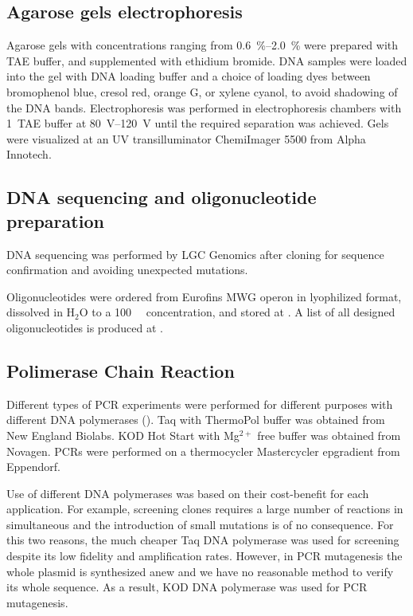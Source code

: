     \subsection{Agarose gels electrophoresis}
      Agarose gels with concentrations ranging from \SIrange{0.6}{2.0}{\percent}
      were prepared with TAE buffer, and supplemented with ethidium bromide.
      DNA samples were loaded into the gel with DNA loading buffer and a
      choice of loading dyes between bromophenol blue, cresol red, orange G, or
      xylene cyanol, to avoid shadowing of the DNA bands. Electrophoresis was
      performed in electrophoresis chambers with \SI{1}{\X}~TAE buffer at
      \SIrange{80}{120}{\volt} until the required separation was achieved.
      Gels were visualized at an UV transilluminator ChemiImager 5500 from
      Alpha Innotech.

    \subsection{DNA sequencing and oligonucleotide preparation}
      DNA sequencing was performed by LGC Genomics after cloning for sequence
      confirmation and avoiding unexpected mutations.

      Oligonucleotides were ordered from Eurofins MWG operon in lyophilized
      format, dissolved in H$_2$O to a \SI{100}{\micro\Molar} concentration,
      and stored at . A list of all designed oligonucleotides is
      produced at .

    \subsection{Polimerase Chain Reaction}
      Different types of PCR experiments were performed for different purposes
      with different DNA polymerases (). Taq with ThermoPol
      buffer was obtained from New England Biolabs. KOD Hot Start with Mg$^{2+}$
      free buffer was obtained from Novagen. PCRs were performed on a thermocycler
      Mastercycler epgradient from Eppendorf.

      Use of different DNA polymerases was based on their cost-benefit for
      each application. For example, screening clones requires a large number
      of reactions in simultaneous and the introduction of small mutations
      is of no consequence. For this two reasons, the much cheaper Taq DNA
      polymerase was used for screening despite its low fidelity and
      amplification rates. However, in PCR mutagenesis the whole plasmid
      is synthesized anew and we have no reasonable method to verify its whole
      sequence. As a result, KOD DNA polymerase was used for PCR mutagenesis.

